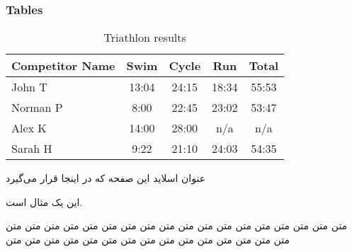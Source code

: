 \begin{frame}
\frametitle{Tables}
\begin{table}
\begin{tabular}{l | c | c | c | c }
Competitor Name & Swim & Cycle & Run & Total \\
\hline \hline
John T & 13:04 & 24:15 & 18:34 & 55:53  \\ 
Norman P & 8:00 & 22:45 & 23:02 & 53:47 \\
Alex K & 14:00 & 28:00 & n/a & n/a \\
Sarah H & 9:22 & 21:10 & 24:03 & 54:35 
\end{tabular}
\caption{Triathlon results}
\end{table}
\end{frame}

\begin{frame}{عنوان اسلاید این صفحه  که در اینجا قرار می‌گیرد}
\begin{example}
این یک مثال است.
\end{example}
\end{frame}

\begin{frame}
\begin{Lemma}
متن متن متن متن متن متن متن متن متن متن متن متن متن متن متن متن متن متن متن متن متن متن متن متن متن متن متن متن متن متن متن متن متن 
\end{Lemma}
\end{frame}

\begin{frame}

\end{frame}
